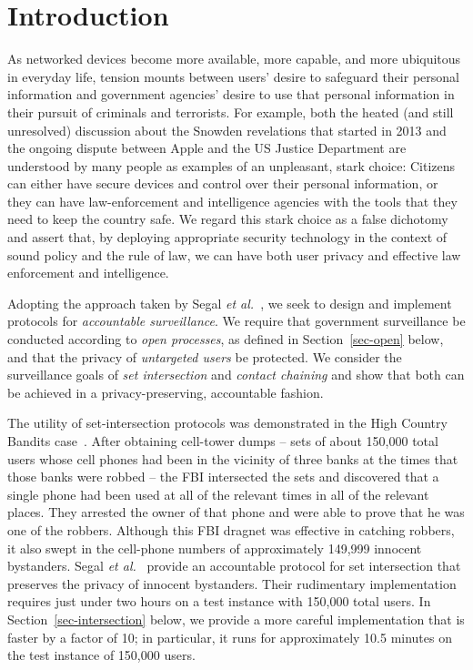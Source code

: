\section{Introduction}\label{sec-introduction}
As networked devices become more available, more capable, and more ubiquitous
in everyday life, tension mounts between users' desire to safeguard their 
personal information and government agencies' desire to use that personal 
information in their pursuit of criminals and terrorists.  For example, 
both the heated (and still unresolved) discussion about the Snowden 
revelations that started in 2013 and the ongoing dispute between Apple and 
the US Justice Department are understood by many people
as examples of an unpleasant, stark choice: Citizens can either have
secure devices and control over their personal information, or they can have
law-enforcement and intelligence agencies with the tools that they need to
keep the country safe. We regard this stark choice as a false dichotomy and 
assert that, by deploying appropriate security technology in the context of 
sound policy and the rule of law, we can have both user privacy and effective 
law enforcement and intelligence.

Adopting the approach taken by Segal {\it et al.}~\cite{sff-foci2014}, we
seek to design and implement protocols for {\it accountable surveillance}.
We require that government surveillance be conducted according to {\it open
processes}, as defined in Section~\ref{sec-open} below, and that the privacy
of {\it untargeted users} be protected.  We consider the surveillance goals
of {\it set intersection} and {\it contact chaining} and show that both can 
be achieved in a privacy-preserving, accountable fashion.

The utility of set-intersection protocols was demonstrated in the 
High Country Bandits case~\cite{anderson13cell}.
After obtaining cell-tower dumps -- sets of about 150,000 total users
whose cell phones had been in the vicinity of three banks at the times
that those banks were robbed -- the FBI intersected the sets and discovered 
that a single phone had been used at all of the relevant times in all of the 
relevant places.  They arrested the owner
of that phone and were able to prove that he was one of the robbers.
Although this FBI dragnet was effective in catching robbers, it also swept
in the cell-phone numbers of approximately 149,999 innocent bystanders.
Segal {\it et al.}~\cite{sff-foci2014} provide an accountable protocol for
set intersection that preserves the privacy of innocent bystanders.  Their
rudimentary implementation requires just under two hours on a test instance
with 150,000 total users.  In Section~\ref{sec-intersection} below, we provide
a more careful implementation that is faster by a factor of 10; in particular,
it runs for approximately 10.5 minutes on the test instance of 150,000 users.

